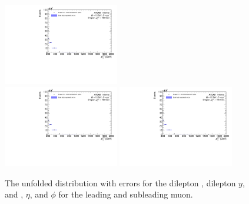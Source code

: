 \begin{figure}[h!]
  \includegraphics[page=188,width=0.45\textwidth]{figures/unfoldErrPlots.pdf} \\
  \includegraphics[page=212,width=0.45\textwidth]{figures/unfoldErrPlots.pdf}
  \includegraphics[page=236,width=0.45\textwidth]{figures/unfoldErrPlots.pdf}
  \caption{The unfolded distribution with errors for the dilepton \pt, dilepton $y$, and \pt, $\eta$, and $\phi$ for the leading and subleading muon.}
  \label{fig:unfoldErr1}
\end{figure}

